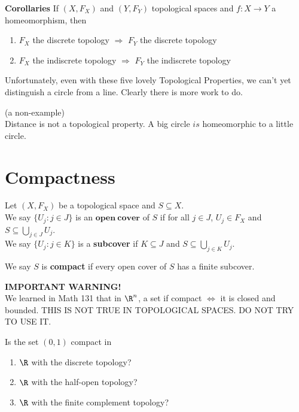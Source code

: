 {\bf Corollaries}
If $(X, F_X) $ and $(Y, F_Y)$ topological spaces and $f: X \rightarrow Y$ a homeomorphism, then 
\begin{enumerate}
\item $F_X$ the discrete topology $\Longrightarrow$ $F_Y$ the discrete topology
\item $F_X$ the indiscrete topology $\Longrightarrow$ $F_Y$ the indiscrete topology
\end{enumerate}

Unfortunately, even with these five lovely Topological Properties, we can't yet distinguish a circle from a line. Clearly there is more work to do.

\begin{example} (a non-example)\\
Distance is not a topological property. A big circle $is$ homeomorphic to a little circle.
\end{example}

\section{Compactness}

\begin{definition}
Let $(X, F_X)$ be a topological space and $S \subseteq X$.\\ 
We say $\{U_j : j \in J\}$ is an $\mathbf{open \ cover}$ of $S$ if for all $j \in J$, $U_j \in F_X$ and $S \subseteq \bigcup_{j \in J}U_j$.\\ 
We say $\{U_j : j \in K\}$ is a {\bf subcover} if $K \subseteq J$ and $S \subseteq \bigcup_{j \in K} U_j$.

We say $S$ is {\bf compact} if every open cover of $S$ has a finite subcover. 
\end{definition}

{\bf IMPORTANT WARNING!}\\
We learned in Math 131 that in $\R^{n}$, a set if compact $\Longleftrightarrow$ it is closed and bounded. THIS IS NOT TRUE IN TOPOLOGICAL SPACES. DO NOT TRY TO USE IT.

\begin{example}
Is the set $(0,1)$ compact in 
\begin{enumerate}
\item $\R$ with the discrete topology?
\item $\R$ with the half-open topology?
\item $\R$ with the finite complement topology?
\end{enumerate}
\end{example}

